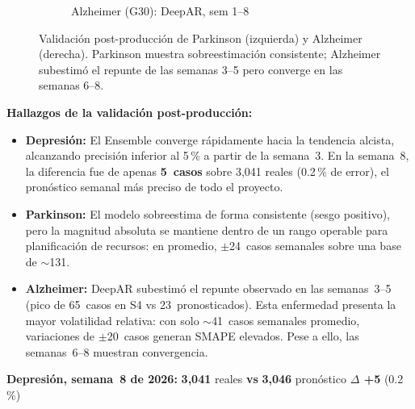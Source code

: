 \documentclass[12pt, letterpaper]{article}
\newenvironment{insightbox}[1][]{\par\medskip\begin{lrbox}{\boxcontents}\begin{minipage}{\dimexpr\textwidth-12pt}\setlength{\emergencystretch}{5em}\setlength{\parskip}{6pt}}{\end{minipage}\end{lrbox}\noindent\colorbox{lightgreen}{\usebox{\boxcontents}}\par\medskip}
\newenvironment{kpibox}[1][]{\par\medskip\begin{lrbox}{\boxcontents}\begin{minipage}{\dimexpr\textwidth-12pt}\setlength{\emergencystretch}{5em}\setlength{\parskip}{6pt}}{\end{minipage}\end{lrbox}\noindent\fbox{\usebox{\boxcontents}}\par\medskip}
\newcommand{\smape}{\textnormal{\textsc{smape}}}
\begin{document}
\begin{figure}[H]
\begin{subfigure}[t]{0.48\textwidth}
{}
\caption{Alzheimer (G30): DeepAR, sem 1--8}
\label{fig:omt_alzheimer}
\end{subfigure}
\caption[Parkinson y Alzheimer: Real vs Pronóstico, semanas 1--8 de 2026.]{Validación post-producción de Parkinson (izquierda) y Alzheimer (derecha). Parkinson muestra sobreestimación consistente; Alzheimer subestimó el repunte de las semanas 3--5 pero converge en las semanas 6--8.}
\end{figure}



\begin{insightbox}
\textbf{Hallazgos de la validación post-producción:}
\begin{itemize}
  \item \textbf{Depresión:} El Ensemble converge rápidamente hacia la tendencia alcista, alcanzando precisión inferior al 5\,\% a partir de la semana~3. En la semana~8, la diferencia fue de apenas \textbf{5~casos} sobre 3{,}041 reales (0.2\,\% de error), el pronóstico semanal más preciso de todo el proyecto.
  \item \textbf{Parkinson:} El modelo sobreestima de forma consistente (sesgo positivo), pero la magnitud absoluta se mantiene dentro de un rango operable para planificación de recursos: en promedio, $\pm$24~casos semanales sobre una base de $\sim$131.
  \item \textbf{Alzheimer:} DeepAR subestimó el repunte observado en las semanas~3--5 (pico de 65~casos en S4 vs 23~pronosticados). Esta enfermedad presenta la mayor volatilidad relativa: con solo $\sim$41~casos semanales promedio, variaciones de $\pm$20~casos generan SMAPE elevados. Pese a ello, las semanas~6--8 muestran convergencia.
\end{itemize}
\end{insightbox}

\smallskip

\begin{kpibox}
\centering
{\normalsize\bfseries\color{teal} Depresión, semana~8 de 2026:}\quad
{\fontsize{24}{28}\selectfont\bfseries\color{darkteal} 3{,}041}
{\small\color{coolgray} reales}\quad
{\Large\bfseries\color{coolgray} vs}\quad
{\fontsize{24}{28}\selectfont\bfseries\color{gold!80!black} 3{,}046}
{\small\color{coolgray} pronóstico}\quad
{\fontsize{18}{22}\selectfont\bfseries\color{burgundy} $\Delta$ +5}
{\small\color{coolgray} (0.2\,\%)}
\end{kpibox}
\end{document}
